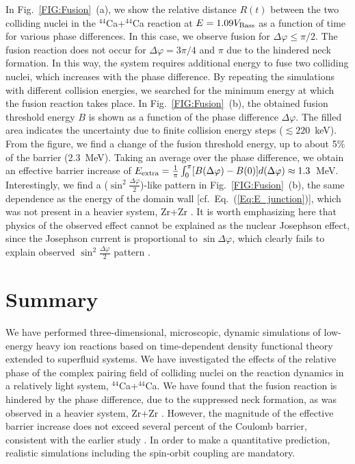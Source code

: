 \documentclass{PoS}
\begin{document}
In Fig.~\ref{FIG:Fusion}~(a), we show the relative distance $R(t)$
between the two colliding nuclei in the $^{44}$Ca+$^{44}$Ca reaction
at $E=1.09V_{\rm Bass}$ as a function of time for various phase differences.
In this case, we observe fusion for $\Delta\varphi \le \pi/2$. The fusion reaction
does not occur for $\Delta\varphi=3\pi/4$ and $\pi$ due to the hindered neck
formation. In this way, the system requires additional energy to fuse two colliding
nuclei, which increases with the phase difference. By repeating the simulations with
different collision energies, we searched for the minimum energy at which the fusion reaction
takes place. In Fig.~\ref{FIG:Fusion}~(b), the obtained fusion threshold energy
$B$ is shown as a function of the phase difference $\Delta\varphi$. The filled
area indicates the uncertainty due to finite collision energy steps ($\lesssim 220$~keV).
From the figure, we find a change of the fusion threshold energy, up to about 5\%
of the barrier (2.3~MeV). Taking an average over the phase difference, we obtain
an effective barrier increase of $E_{\rm extra} = \frac{1}{\pi}\int_0^\pi
[B(\Delta\varphi)-B(0)] d(\Delta\varphi) \approx 1.3$~MeV. Interestingly,
we find a ($\sin^2\frac{\Delta\varphi}{2}$)-like pattern in Fig.~\ref{FIG:Fusion}~(b),
the same dependence as the energy of the domain wall [cf.~Eq.~(\ref{Eq:E_junction})],
which was not present in a heavier system, Zr+Zr \cite{soliton}. It is worth emphasizing
here that physics of the observed effect cannot be explained as the nuclear Josephson effect, since
the Josephson current is proportional to $\sin\Delta\varphi$, which clearly
fails to explain observed $\sin^2\frac{\Delta\varphi}{2}$ pattern \cite{soliton}.


\section{Summary}{\label{sec:summary}}

We have performed three-dimensional, microscopic, dynamic simulations
of low-energy heavy ion reactions based on time-dependent density functional
theory extended to superfluid systems. We have investigated the effects of the
relative phase of the complex pairing field of colliding nuclei on the reaction
dynamics in a relatively light system, $^{44}$Ca+$^{44}$Ca. We have found
that the fusion reaction is hindered by the phase difference, due to the suppressed
neck formation, as was observed in a heavier system, Zr+Zr \cite{soliton}.
However, the magnitude of the effective barrier increase does not exceed several percent
of the Coulomb barrier, consistent with the earlier study \cite{HS(TDHFB)}.
In order to make a quantitative prediction, realistic simulations including
the spin-orbit coupling are mandatory.
\end{document}
